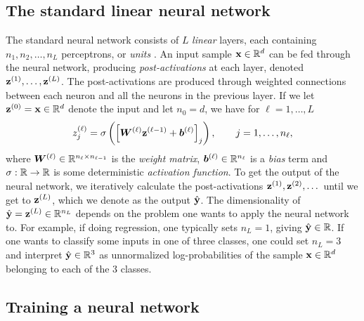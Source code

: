\documentclass{statsmsc}
\begin{document}
{\subsection{The standard linear neural network}%
\label{sub:The standard linear neural network}

The standard neural network consists of $L$ \textit{linear} layers, each containing
$n_1,n_2,\dots,n_L$ perceptrons, or \textit{units} \citep{dnn}. An input sample $\mathbf{x} \in \mathbb{R}^d$ can be fed
through the neural network, producing \textit{post-activations} at each layer, denoted
$\mathbf{z}^{(1)}, \dots, \mathbf{z}^{(L)}$. The post-activations are produced through weighted
connections between each neuron and all the neurons in the previous layer. If we let
$\mathbf{z}^{(0)}=\mathbf{x} \in \mathbb{R}^d$ denote the input and let $n_0=d$, we have for $\ell=1,\dots,L$
\begin{equation}\label{eq:nn_update}
    z_j^{(\ell)} = \sigma \left(\left[ \boldsymbol{W}^{(\ell)} \mathbf{z}^{(\ell-1)} + \boldsymbol{b}^{(\ell)} \right]_j \right),\qquad j=1,\dots,n_\ell,
\end{equation}
where $\boldsymbol{W}^{(\ell)} \in \mathbb{R}^{n_{\ell} \times n_{\ell-1}}$ is the \textit{weight matrix},
$\boldsymbol{b}^{(\ell)} \in \mathbb{R}^{n_{\ell}}$ is a \textit{bias} term and
$\sigma : \mathbb{R} \rightarrow {\mathbb{R}}$ is some deterministic \textit{activation function}.
To get the output of the neural network, we iteratively calculate the post-activations
$\mathbf{z}^{(1)},\mathbf{z}^{(2)},\dots$ until we get to $\mathbf{z}^{(L)}$, which we denote as the output
$\hat{\mathbf{y}}$. The dimensionality of $\hat{\mathbf{y}}=\mathbf{z}^{(L)} \in \mathbb{R}^{n_L}$
depends on the problem one wants
to apply the neural network to. For example, if doing regression, one typically sets
$n_L=1$, giving $\hat{\mathbf{y}} \in \mathbb{R}$. If one wants to classify some inputs in one of three classes,
one could set $n_L=3$ and interpret $\hat{\mathbf{y}} \in \mathbb{R}^3$ as unnormalized log-probabilities of
the sample $\mathbf{x} \in \mathbb{R}^d$ belonging to each of the 3 classes.

\subsection{Training a neural network}%
\label{sub:Training a neural network}

}
\end{document}
